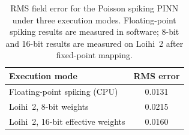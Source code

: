 \begin{table}[t]
  \centering
  \caption{RMS field error for the Poisson spiking PINN under three execution modes. Floating-point spiking results are measured in software; 8-bit and 16-bit results are measured on Loihi~2 after fixed-point mapping.}
  \label{tab:conversion:loihi-accuracy}
  \begin{tabular}{lc}
    \toprule
    Execution mode & RMS error \\
    \midrule
    Floating-point spiking (CPU) & 0.0131 \\
    Loihi~2, 8-bit weights & 0.0215 \\
    Loihi~2, 16-bit effective weights & 0.0160 \\
    \bottomrule
  \end{tabular}
\end{table}
